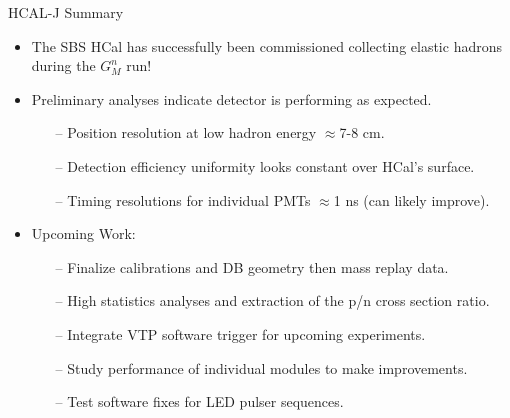 \documentclass[10pt]{beamer}
\begin{document}
\begin{frame}{HCAL-J Summary}

\begin{itemize}
	\item \alert{The SBS HCal has successfully been commissioned collecting elastic hadrons during the $G_M^n$ run!}
	\item {}\alert{Preliminary analyses indicate detector is performing as expected.}
		\begin{itemize}
			\item[--] Position resolution at low hadron energy $\approx$7-8 cm.
			\item[--] Detection efficiency uniformity looks constant over HCal's surface.
			\item[--] Timing resolutions for individual PMTs $\approx$1 ns (can likely improve).
		\end{itemize}
	\item {}\alert{Upcoming Work:}
		\begin{itemize}
			\item[--] Finalize calibrations and DB geometry then mass replay data.
			\item[--] High statistics analyses and extraction of the p/n cross section ratio.
			\item[--] Integrate VTP software trigger for upcoming experiments.
			\item[--] Study performance of individual modules to make improvements.
			\item[--] Test software fixes for LED pulser sequences.
		\end{itemize}
\end{itemize}

\end{frame}
\end{document}
